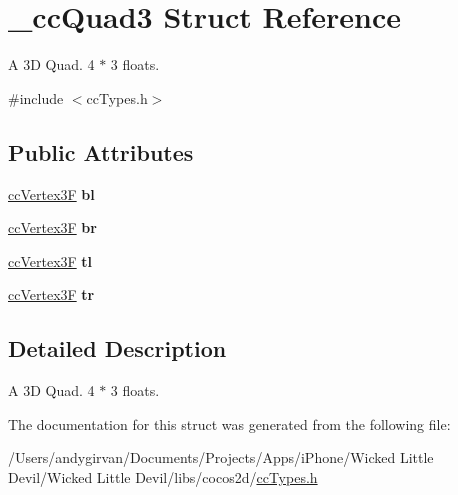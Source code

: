 \hypertarget{struct__cc_quad3}{\section{\-\_\-cc\-Quad3 Struct Reference}
\label{struct__cc_quad3}
}


A 3\-D Quad. 4 $\ast$ 3 floats.  




{\ttfamily \#include $<$cc\-Types.\-h$>$}

\subsection*{Public Attributes}
\begin{DoxyCompactItemize}
\item 
\hypertarget{struct__cc_quad3_a3d5f59cb7331ac77a9ddea620dfb9dd8}{\hyperlink{cc_types_8h_a351ac51e9885af9a15676faf8cb49f8a}{cc\-Vertex3\-F} {\bfseries bl}}\label{struct__cc_quad3_a3d5f59cb7331ac77a9ddea620dfb9dd8}

\item 
\hypertarget{struct__cc_quad3_ab9b7793ba2668672217d266f327582a7}{\hyperlink{cc_types_8h_a351ac51e9885af9a15676faf8cb49f8a}{cc\-Vertex3\-F} {\bfseries br}}\label{struct__cc_quad3_ab9b7793ba2668672217d266f327582a7}

\item 
\hypertarget{struct__cc_quad3_a136635028d20c4861fa38267d6804313}{\hyperlink{cc_types_8h_a351ac51e9885af9a15676faf8cb49f8a}{cc\-Vertex3\-F} {\bfseries tl}}\label{struct__cc_quad3_a136635028d20c4861fa38267d6804313}

\item 
\hypertarget{struct__cc_quad3_a7dfdaec27e077a7057300f453e1e3e1b}{\hyperlink{cc_types_8h_a351ac51e9885af9a15676faf8cb49f8a}{cc\-Vertex3\-F} {\bfseries tr}}\label{struct__cc_quad3_a7dfdaec27e077a7057300f453e1e3e1b}

\end{DoxyCompactItemize}


\subsection{Detailed Description}
A 3\-D Quad. 4 $\ast$ 3 floats. 

The documentation for this struct was generated from the following file\-:\begin{DoxyCompactItemize}
\item 
/\-Users/andygirvan/\-Documents/\-Projects/\-Apps/i\-Phone/\-Wicked Little Devil/\-Wicked Little Devil/libs/cocos2d/\hyperlink{cc_types_8h}{cc\-Types.\-h}\end{DoxyCompactItemize}

